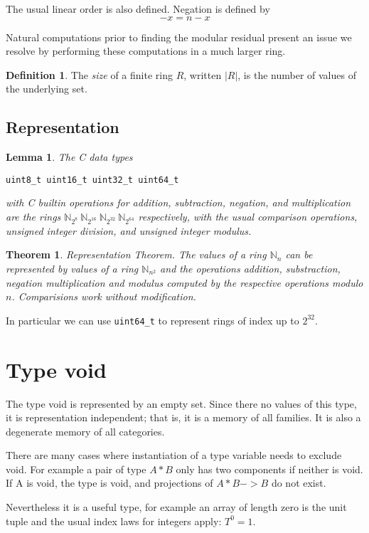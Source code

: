 \documentclass[oneside]{book}
\theoremstyle{plain}
\theoremstyle{definition}
\newtheorem{definition}{Definition}
\theoremstyle{plain}
\newtheorem{lemma}{Lemma}
\newtheorem{theorem}{Theorem}
\begin{document}
The usual linear order is also defined.  Negation is defined by
$$-x = n - x$$

Natural computations prior to finding the modular residual present an issue
we resolve by performing these computations in a much larger ring.

\begin{definition}
The {\em size} of a finite ring $R$, written $|R|$, is the number of values of the underlying set.
\end{definition}
\subsection{Representation}
\begin{lemma} The C data types
\begin{verbatim}
uint8_t uint16_t uint32_t uint64_t
\end{verbatim}
with C builtin operations for addition, subtraction, negation, and multiplication
are the rings
\(\mathbb{N}_{2^8}\ \mathbb{N}_{2^{16}}\ \mathbb{N}_{2^{32}}\ \mathbb{N}_{2^{64}} \)
respectively, with the usual comparison operations, unsigned integer division,
and unsigned integer modulus.
\end{lemma}

\begin{theorem}
{\em Representation Theorem}. The values of a ring $\mathbb{N}_n$ can be represented
by values of a ring $\mathbb{N}_{n^2}$ and the operations addition, substraction, negation
multiplication and modulus computed by the respective operations modulo $n$. Comparisions
work without modification.
\end{theorem}
In particular we can use \verb$uint64_t$ to represent rings of index up to 
$2^{32}$.

\section{Type void}
The type void is represented by an empty set. Since there no values
of this type, it is representation independent; that is, it is a memory
of all families. It is also a degenerate memory of all categories.

There are many cases where instantiation of a type variable needs to exclude void.
For example a pair of type $A * B$ only has two components if neither is void.
If A is void, the type is void, and projections of $A * B -> B$ do not exist.

Nevertheless it is a useful type, for example an array of length zero is the
unit tuple and the usual index laws for integers apply: $T^0 = 1$.
\end{document}
